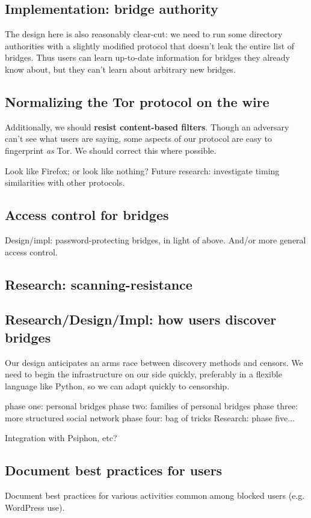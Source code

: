 \documentclass{article}
\begin{document}
\subsection{Implementation: bridge authority}

The design here is also reasonably clear-cut: we need to run some
directory authorities with a slightly modified protocol that doesn't leak
the entire list of bridges. Thus users can learn up-to-date information
for bridges they already know about, but they can't learn about arbitrary
new bridges.

\subsection{Normalizing the Tor protocol on the wire}
Additionally, we should {\bf resist content-based filters}.  Though an
adversary can't see what users are saying, some aspects of our protocol are
easy to fingerprint {\em as} Tor.  We should correct this where possible.

Look like Firefox; or look like nothing?
Future research: investigate timing similarities with other protocols.

\subsection{Access control for bridges}
Design/impl: password-protecting bridges, in light of above.
And/or more general access control.

\subsection{Research: scanning-resistance}

\subsection{Research/Design/Impl: how users discover bridges}
Our design anticipates an arms race between discovery methods and censors.
We need to begin the infrastructure on our side quickly, preferably in a
flexible language like Python, so we can adapt quickly to censorship.

phase one: personal bridges
phase two: families of personal bridges
phase three: more structured social network
phase four: bag of tricks
Research: phase five...

Integration with Psiphon, etc?

\subsection{Document best practices for users}
Document best practices for various activities common among
blocked users (e.g. WordPress use).
\end{document}
